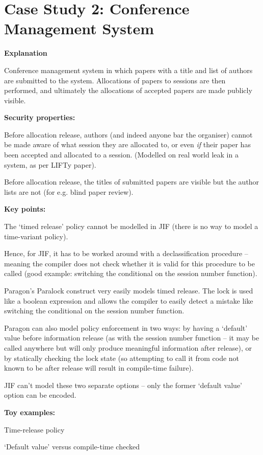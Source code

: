 \section{Case Study 2: Conference Management System}

\textbf{Explanation}

Conference management system in which papers with a title and list of authors are submitted to the system. Allocations of papers to sessions are then performed, and ultimately the allocations of accepted papers are made publicly visible.

\textbf{Security properties:}

Before allocation release, authors (and indeed anyone bar the organiser) cannot be made aware of what session they are allocated to, or even \textit{if} their paper has been accepted and allocated to a session. (Modelled on real world leak in a system, as per LIFTy paper).

Before allocation release, the titles of submitted papers are visible but the author lists are not (for e.g. blind paper review).

\textbf{Key points:}

The `timed release' policy cannot be modelled in JIF (there is no way to model a time-variant policy).

Hence, for JIF, it has to be worked around with a declassification procedure -- meaning the compiler does not check whether it is valid for this procedure to be called (good example: switching the conditional on the session number function).

Paragon's Paralock construct very easily models timed release. The lock is used like a boolean expression and allows the compiler to easily detect a mistake like switching the conditional on the session number function.

Paragon can also model policy enforcement in two ways: by having a `default' value before information release (as with the session number function -- it may be called anywhere but will only produce meaningful information after release), or by statically checking the lock state (so attempting to call it from code not known to be after release will result in compile-time failure).

JIF can't model these two separate options -- only the former `default value' option can be encoded.

\textbf{Toy examples:}

Time-release policy

`Default value' versus compile-time checked

